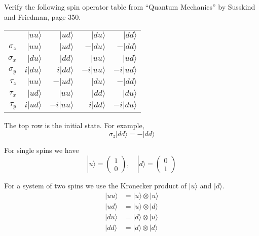 \documentclass[12pt]{article}
\begin{document}
Verify the following spin operator table from ``Quantum Mechanics'' by Susskind and Friedman, page 350.

\begin{center}
\begin{tabular}{rrrrr}
& $|uu\rangle$ & $|ud\rangle$ & $|du\rangle$ & $|dd\rangle$
\\[1ex]
$\sigma_z$ & $|uu\rangle$ & $|ud\rangle$ & $-|du\rangle$ & $-|dd\rangle$
\\
$\sigma_x$ & $|du\rangle$ & $|dd\rangle$ & $|uu\rangle$ & $|ud\rangle$
\\
$\sigma_y$ & $i|du\rangle$ & $i|dd\rangle$ & $-i|uu\rangle$ & $-i|ud\rangle$
\\
$\tau_z$ & $|uu\rangle$ & $-|ud\rangle$ & $|du\rangle$ & $-|dd\rangle$
\\
$\tau_x$ & $|ud\rangle$ & $|uu\rangle$ & $|dd\rangle$ & $|du\rangle$
\\
$\tau_y$ & $i|ud\rangle$ & $-i|uu\rangle$ & $i|dd\rangle$ & $-i|du\rangle$
\end{tabular}
\end{center}

The top row is the initial state.
For example,
\begin{equation*}
\sigma_z|dd\rangle=-|dd\rangle
\end{equation*}

For single spins we have
\begin{equation*}
|u\rangle=\begin{pmatrix}1\\0\end{pmatrix},
\quad
|d\rangle=\begin{pmatrix}0\\1\end{pmatrix}
\end{equation*}

For a system of two spins we use the Kronecker product of $|u\rangle$ and $|d\rangle$.
\begin{align*}
|uu\rangle&=|u\rangle\otimes|u\rangle
\\
|ud\rangle&=|u\rangle\otimes|d\rangle
\\
|du\rangle&=|d\rangle\otimes|u\rangle
\\
|dd\rangle&=|d\rangle\otimes|d\rangle
\end{align*}
\end{document}
